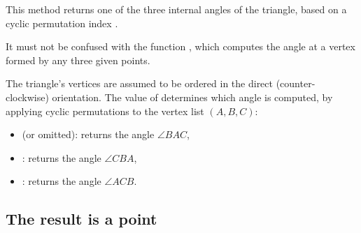 This method returns one of the three internal angles of the triangle, based on a cyclic permutation index .

\medskip
\noindent
It must not be confused with the function , which computes the angle at a vertex formed by any three given points.

\medskip
\noindent
The triangle's vertices are assumed to be ordered in the direct (counter-clockwise) orientation. The value of  determines which angle is computed, by applying cyclic permutations to the vertex list $(A, B, C)$:

\begin{itemize}
  \item {} (or omitted): returns the angle $∠BAC$,
  \item {}: returns the angle $∠CBA$,
  \item {}: returns the angle $∠ACB$.
\end{itemize}

\vspace{1em}


\begin{tkzexample}[latex=7cm]
\begin{center}
\end{center}
\end{tkzexample}






\subsection{The result is a point} %

